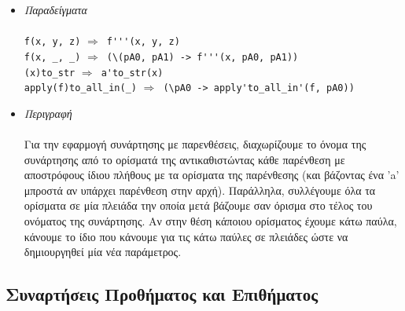\documentclass[diploma]{softlab-thesis}
\def\lra{$\Longrightarrow$\ }
\begin{document}
\begin{itemize}
\item
\textit{Παραδείγματα}\\\\
\verb|f(x, y, z)| \lra \verb|f'''(x, y, z)| \\
\verb|f(x, _, _)| \lra \verb|(\(pA0, pA1) -> f'''(x, pA0, pA1))| \\
\verb|(x)to_str| \lra \verb|a'to_str(x)| \\
\verb|apply(f)to_all_in(_)| \lra \verb|(\pA0 -> apply'to_all_in'(f, pA0))| \\

\item
\textit{Περιγραφή}\\\\
Για την εφαρμογή συνάρτησης με παρενθέσεις, διαχωρίζουμε το όνομα της
συνάρτησης από το ορίσματά της αντικαθιστώντας κάθε παρένθεση με αποστρόφους
ίδιου πλήθους με τα ορίσματα της παρένθεσης (και βάζοντας ένα 'a' μπροστά
αν υπάρχει παρένθεση στην αρχή). Παράλληλα, συλλέγουμε όλα τα ορίσματα σε μία
πλειάδα την οποία μετά βάζουμε σαν όρισμα στο τέλος του ονόματος της
συνάρτησης. Αν στην θέση κάποιου ορίσματος έχουμε κάτω παύλα, κάνουμε το ίδιο
που κάνουμε για τις κάτω παύλες σε πλειάδες ώστε να δημιουργηθεί μία νέα
παράμετρος.

\end{itemize}

\subsection{Συναρτήσεις Προθήματος και Επιθήματος}
\end{document}
